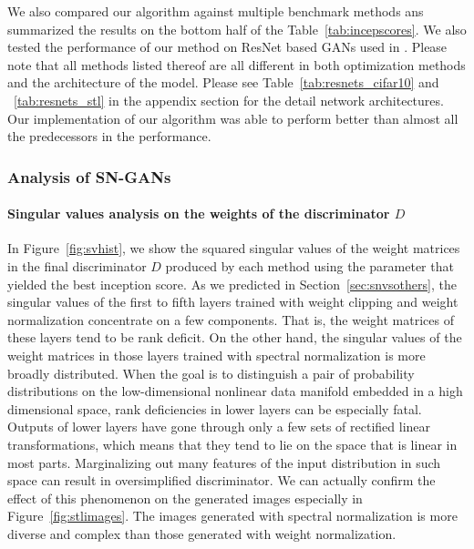 We also compared our algorithm against multiple benchmark methods ans summarized the results on the bottom half of the Table~\ref{tab:incepscores}.
We also tested the performance of our method on ResNet based GANs used in \cite{gulrajani2017improved}. Please note that all methods listed thereof are all different in both optimization methods and the architecture of the model. Please see Table~\ref{tab:resnets_cifar10} and ~\ref{tab:resnets_stl} in the appendix section for the detail network architectures. Our implementation of our algorithm was able to perform better than almost all the predecessors in the performance.  


\subsubsection{Analysis of SN-GANs}

\paragraph{Singular values analysis on the weights of the discriminator $D$} In Figure~\ref{fig:svhist}, we show the squared singular values of the weight matrices in the final discriminator $D$ produced by each method using the parameter that yielded the best inception score. As we predicted in Section~\ref{sec:snvsothers}, the singular values of the first to fifth layers trained with weight clipping and weight normalization concentrate on a few components. That is, the weight matrices of these layers tend to be rank deficit. On the other hand, the singular values of the weight matrices in those layers trained with spectral normalization is more broadly distributed. When the goal is to distinguish a pair of probability distributions on the low-dimensional nonlinear data manifold embedded in a high dimensional space, rank deficiencies in lower layers can be especially fatal. Outputs of lower layers have gone through only a few sets of rectified linear transformations, which means that they tend to lie on the space that is linear in most parts. Marginalizing out many features of the input distribution in such space can result in oversimplified discriminator. We can actually confirm the effect of this phenomenon on the generated images especially in Figure~\ref{fig:stlimages}.
The images generated with spectral normalization is more diverse and complex than those generated with weight normalization.

